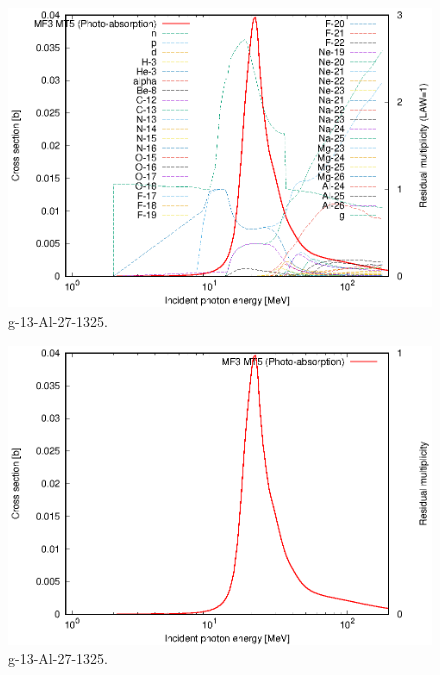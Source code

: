 \begin{figure}
 \includegraphics[width=\linewidth]{eps/g_13-Al-27_1325.eps}
  \caption{g-13-Al-27-1325.}
\end{figure}
\begin{figure}
 \includegraphics[width=\linewidth]{eps-law0/g_13-Al-27_1325.eps}
 \caption{g-13-Al-27-1325.}
\end{figure}
\newpage \clearpage

